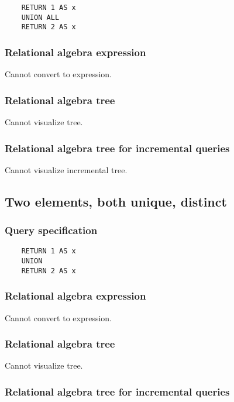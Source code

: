 	\begin{lstlisting}
	RETURN 1 AS x
	UNION ALL
	RETURN 2 AS x
	\end{lstlisting}


	\subsubsection*{Relational algebra expression}

	Cannot convert to expression.

	\subsubsection*{Relational algebra tree}

	Cannot visualize tree.

	\subsubsection*{Relational algebra tree for incremental queries}

	Cannot visualize incremental tree.
	\subsection{Two elements, both unique, distinct}

	\subsubsection*{Query specification}

	\begin{lstlisting}
	RETURN 1 AS x
	UNION
	RETURN 2 AS x
	\end{lstlisting}


	\subsubsection*{Relational algebra expression}

	Cannot convert to expression.

	\subsubsection*{Relational algebra tree}

	Cannot visualize tree.

	\subsubsection*{Relational algebra tree for incremental queries}

